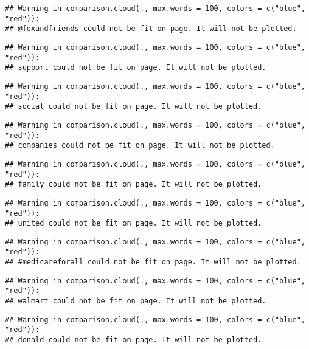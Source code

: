 \documentclass[]{article}
\begin{document}
\begin{verbatim}
## Warning in comparison.cloud(., max.words = 100, colors = c("blue", "red")):
## @foxandfriends could not be fit on page. It will not be plotted.
\end{verbatim}

\begin{verbatim}
## Warning in comparison.cloud(., max.words = 100, colors = c("blue", "red")):
## support could not be fit on page. It will not be plotted.
\end{verbatim}

\begin{verbatim}
## Warning in comparison.cloud(., max.words = 100, colors = c("blue", "red")):
## social could not be fit on page. It will not be plotted.
\end{verbatim}

\begin{verbatim}
## Warning in comparison.cloud(., max.words = 100, colors = c("blue", "red")):
## companies could not be fit on page. It will not be plotted.
\end{verbatim}

\begin{verbatim}
## Warning in comparison.cloud(., max.words = 100, colors = c("blue", "red")):
## family could not be fit on page. It will not be plotted.
\end{verbatim}

\begin{verbatim}
## Warning in comparison.cloud(., max.words = 100, colors = c("blue", "red")):
## united could not be fit on page. It will not be plotted.
\end{verbatim}

\begin{verbatim}
## Warning in comparison.cloud(., max.words = 100, colors = c("blue", "red")):
## #medicareforall could not be fit on page. It will not be plotted.
\end{verbatim}

\begin{verbatim}
## Warning in comparison.cloud(., max.words = 100, colors = c("blue", "red")):
## walmart could not be fit on page. It will not be plotted.
\end{verbatim}

\begin{verbatim}
## Warning in comparison.cloud(., max.words = 100, colors = c("blue", "red")):
## donald could not be fit on page. It will not be plotted.
\end{verbatim}
\end{document}
